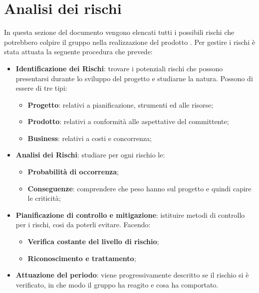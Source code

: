 \newpage
\section{Analisi dei rischi}

	In questa sezione del documento vengono elencati tutti i possibili rischi che potrebbero colpire il gruppo \gruppo nella realizzazione del prodotto \progetto. Per gestire i rischi è stata attuata la seguente procedura che prevede: 
	
	\begin{itemize}
		
		\item \textbf{Identificazione dei Rischi}: trovare i potenziali rischi che possono presentarsi durante lo sviluppo del progetto e studiarne la natura. Possono di essere di tre tipi:
			\begin{itemize}
				\item \textbf{Progetto}: relativi a pianificazione, strumenti ed alle risorse;
				\item \textbf{Prodotto}: relativi a conformità alle aspettative del committente;
				\item \textbf{Business}: relativi a costi e concorrenza;
			\end{itemize} 
				
		\item \textbf{Analisi dei Rischi}: studiare per ogni rischio le: 	
			\begin{itemize}
				\item \textbf{Probabilità di occorrenza};
				\item \textbf{Conseguenze}: comprendere che peso hanno sul progetto e quindi capire le criticità; 			
			\end{itemize}
		
		\item \textbf{Pianificazione di controllo e mitigazione}: istituire metodi di controllo per i rischi, cosi da poterli evitare. Facendo:
			\begin{itemize}
				\item \textbf{Verifica costante del livello di rischio};
				\item \textbf{Riconoscimento e trattamento};
			\end{itemize}
			
		\item \textbf{Attuazione del periodo}: viene progressivamente descritto se il rischio si è verificato, in che modo il gruppo ha reagito e cosa ha comportato. 
		
	\end{itemize}

